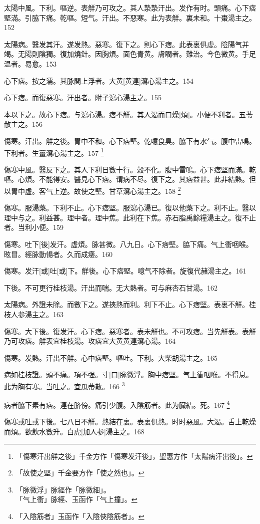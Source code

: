 \documentclass[12pt,oneside,UTF8,b5paper]{ctexbook}她她她她她她她
\begin{document}
太陽中風。下利。嘔逆。表觧乃可攻之。其人漐漐汗出。发作有时。頭痛。心下痞堅滿。引脇下痛。乾嘔。短气。汗出。不惡寒。此为表觧。裏未和。十棗湯主之。152

太陽病。醫发其汗。遂发熱。惡寒。復下之。則心下痞。此表裏俱虚。陰陽气并竭。无陽則陰獨。復加燒針。因胸煩。面色青黄。膚瞤者。難治。今色微黄。手足温者。易愈。153

心下痞。按之濡。其脉関上浮者。大黄[黄連]瀉心湯主之。154

心下痞。而復惡寒。汗出者。附子瀉心湯主之。155

本以下之。故心下痞。与瀉心湯。痞不觧。其人渴而口燥[煩]。小便不利者。五苓散主之。156

傷寒。汗出。觧之後。胃中不和。心下痞堅。乾噫食臭。脇下有水气。腹中雷鳴。下利者。生薑瀉心湯主之。157
	\footnote{「傷寒汗出觧之後」千金方作「傷寒发汗後」，聖惠方作「太陽病汗出後」。}

傷寒中風。醫反下之。其人下利日數十行。穀不化。腹中雷鳴。心下痞堅而滿。乾嘔。心煩。不能得安。醫見心下痞。谓病不尽。復下之。其痞益甚。此非結熱。但以胃中虚。客气上逆。故使之堅。甘草瀉心湯主之。158
	\footnote{「故使之堅」千金要方作「使之然也」。}

傷寒。服湯藥。下利不止。心下痞堅。服瀉心湯已。復以他藥下之。利不止。醫以理中与之。利益甚。理中者。理中焦。此利在下焦。赤石脂禹餘糧湯主之。復不止者。当利小便。159

傷寒。吐下[後]发汗。虚煩。脉甚微。八九日。心下痞堅。脇下痛。气上衝咽喉。眩冒。經脉動愓者。久而成痿。160

傷寒。发汗[或]吐[或]下。觧後。心下痞堅。噫气不除者。旋復代赭湯主之。161

下後。不可更行桂枝湯。汗出而喘。无大熱者。可与麻杏石甘湯。162

太陽病。外證未除。而數下之。遂挾熱而利。利下不止。心下痞堅。表裏不觧。桂枝人参湯主之。163

傷寒。大下後。復发汗。心下痞。惡寒者。表未觧也。不可攻痞。当先觧表。表觧乃可攻痞。觧表宜桂枝湯。攻痞宜大黄黄連瀉心湯。164

傷寒。发熱。汗出不觧。心中痞堅。嘔吐。下利。大柴胡湯主之。165

病如桂枝證。頭不痛。項不强。寸[口]脉微浮。胸中痞堅。气上衝咽喉。不得息。此为胸有寒。当吐之。宜瓜蒂散。166
	\footnote{「脉微浮」脉經作「脉微細」。\\「气上衝」脉經、玉函作「气上撞」。}

病者脇下素有痞。連在脐傍。痛引少腹。入陰筋者。此为臓結。死。167
	\footnote{「入陰筋者」玉函作「入陰俠陰筋者」。}

傷寒或吐或下後。七八日不觧。熱結在裏。表裏俱熱。时时惡風。大渴。舌上乾燥而煩。欲飲水數升。白虎[加人参]湯主之。168
\end{document}
